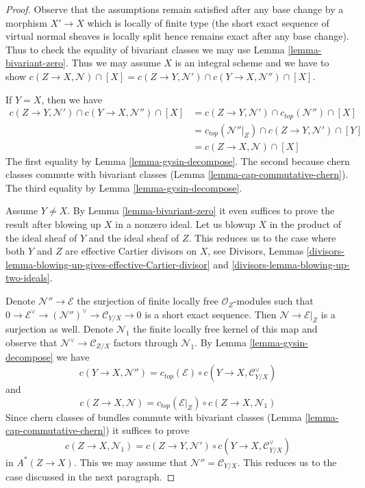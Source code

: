 \begin{proof}
Observe that the assumptions remain satisfied after any base change
by a morphism $X' \to X$ which is locally of finite type (the short
exact sequence of virtual normal sheaves is locally split hence
remains exact after any base change). Thus to check the
equality of bivariant classes we may use Lemma \ref{lemma-bivariant-zero}.
Thus we may assume $X$ is an integral scheme and we have to show
$c(Z \to X, \mathcal{N}) \cap [X] =
c(Z \to Y, \mathcal{N}') \cap c(Y \to X, \mathcal{N}'') \cap [X]$.

\medskip\noindent
If $Y = X$, then we have
\begin{align*}
c(Z \to Y, \mathcal{N}') \cap c(Y \to X, \mathcal{N}'') \cap [X]
& =
c(Z \to Y, \mathcal{N}') \cap c_{top}(\mathcal{N}'') \cap [X] \\
& =
c_{top}(\mathcal{N}''|_Z) \cap c(Z \to Y, \mathcal{N}') \cap [Y] \\
& =
c(Z \to X, \mathcal{N}) \cap [X] 
\end{align*}
The first equality by Lemma \ref{lemma-gysin-decompose}.
The second because chern classes commute with bivariant classes
(Lemma \ref{lemma-cap-commutative-chern}).
The third equality by Lemma \ref{lemma-gysin-decompose}.

\medskip\noindent
Assume $Y \not = X$. By Lemma \ref{lemma-bivariant-zero}
it even suffices to prove the result after blowing up $X$ in a nonzero ideal.
Let us blowup $X$ in the product of the ideal sheaf of $Y$ and the ideal
sheaf of $Z$. This reduces us to the case where both $Y$ and $Z$ are
effective Cartier divisors on $X$, see
Divisors, Lemmas
\ref{divisors-lemma-blowing-up-gives-effective-Cartier-divisor} and
\ref{divisors-lemma-blowing-up-two-ideals}.

\medskip\noindent
Denote $\mathcal{N}'' \to \mathcal{E}$ the surjection of finite locally
free $\mathcal{O}_Z$-modules such that
$0 \to \mathcal{E}^\vee \to (\mathcal{N}'')^\vee \to \mathcal{C}_{Y/X} \to 0$
is a short exact sequence. Then $\mathcal{N} \to \mathcal{E}|_Z$
is a surjection as well. Denote $\mathcal{N}_1$ the finite locally free kernel
of this map and observe that $\mathcal{N}^\vee \to \mathcal{C}_{Z/X}$
factors through $\mathcal{N}_1$.
By Lemma \ref{lemma-gysin-decompose} we have
$$
c(Y \to X, \mathcal{N}'') = c_{top}(\mathcal{E}) \circ
c(Y \to X, \mathcal{C}_{Y/X}^\vee)
$$
and
$$
c(Z \to X, \mathcal{N}) = c_{top}(\mathcal{E}|_Z) \circ
c(Z \to X, \mathcal{N}_1)
$$
Since chern classes of bundles commute with bivariant classes
(Lemma \ref{lemma-cap-commutative-chern})
it suffices to prove
$$
c(Z \to X, \mathcal{N}_1) =
c(Z \to Y, \mathcal{N}') \circ c(Y \to X, \mathcal{C}_{Y/X}^\vee)
$$
in $A^*(Z \to X)$. This we may assume that $\mathcal{N}'' = \mathcal{C}_{Y/X}$.
This reduces us to the case discussed in the next paragraph.


\end{proof}
